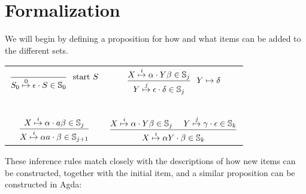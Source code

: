 	\section{Formalization}

		We will begin by defining a proposition for how and what items can be
		added to the different sets.

		\begin{table}[h]
			\centering
			\begin{tabular}{cc}
				\( \displaystyle \frac{}
					{\earley{S_0}{\epsilon}{S}{0} \in \mathbb{S}_0}
					~~\textrm{start } S
					\) &
				\( \displaystyle \frac
					{\earley{X}{\alpha}{Y\beta}{i} \in \mathbb{S}_j}
					{\earley{Y}{\epsilon}{\delta}{j} \in \mathbb{S}_j}
					~~Y \mapsto \delta
					\)
				\\~&~\\
				\( \displaystyle \frac
					{\earley{X}{\alpha}{a\beta}{i} \in \mathbb{S}_j}
					{\earley{X}{\alpha a}{\beta}{i} \in \mathbb{S}_{j+1}}
					\) &
				\( \displaystyle \frac
					{
						\earley{X}{\alpha}{Y\beta}{i} \in \mathbb{S}_j~~~~
						\earley{Y}{\gamma}{\epsilon}{j} \in \mathbb{S}_k
						}
					{\earley{X}{\alpha Y}{\beta}{i} \in \mathbb{S}_k}
					\)
			\end{tabular}
		\end{table}

		These inference rules match closely with the descriptions of how new
		items can be constructed, together with the initial item, and a similar
		proposition can be constructed in Agda:

